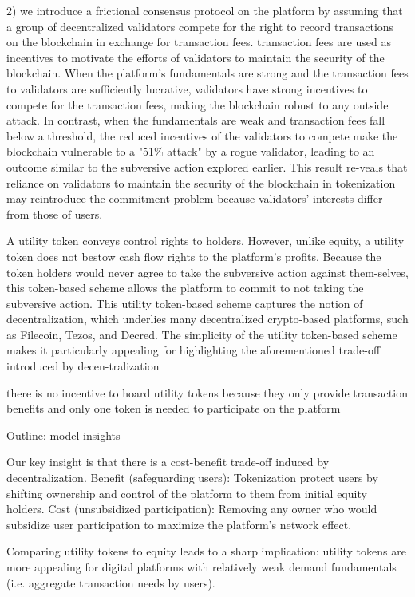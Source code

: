                2) we introduce a frictional consensus protocol on the platform by assuming that a group of decentralized validators compete for the right to record transactions on the blockchain in exchange for transaction fees. transaction fees are used as incentives to motivate the efforts of validators to maintain the security of the blockchain. When the platform's fundamentals are strong and the transaction fees to validators are sufficiently lucrative, validators have strong incentives to compete for the transaction fees, making the blockchain robust to any outside attack. In contrast, when the fundamentals are weak and transaction fees fall below a threshold, the reduced incentives of the validators to compete make the blockchain vulnerable to a "51\% attack" by a rogue validator, leading to an outcome similar to the subversive action explored earlier. This result re-veals that reliance on validators to maintain the security of the blockchain in tokenization may reintroduce the commitment problem because validators' interests differ from those of users.

        A utility token conveys control rights to holders. However, unlike equity, a utility token does not bestow cash flow rights to the platform's profits. Because the token holders would never agree to take the subversive action against them-selves, this token-based scheme allows the platform to commit to not taking the subversive action. This utility token-based scheme captures the notion of decentralization, which underlies many decentralized crypto-based platforms, such as Filecoin, Tezos, and Decred. The simplicity of the utility token-based scheme makes it particularly appealing for highlighting the aforementioned trade-off introduced by decen-tralization

        there is no incentive to hoard utility tokens because they only provide transaction benefits and only one token is needed to participate on the platform

        Outline: model insights

        Our key insight is that there is a cost-benefit trade-off induced by decentralization. Benefit (safeguarding users): Tokenization  protect users by shifting ownership and control of the platform to them from initial equity holders. Cost (unsubsidized participation): Removing any owner who would subsidize user participation to maximize the platform's network effect.

        Comparing utility tokens to equity leads to a sharp implication: utility tokens are more appealing for digital platforms with relatively weak demand fundamentals (i.e. aggregate transaction needs by users).

